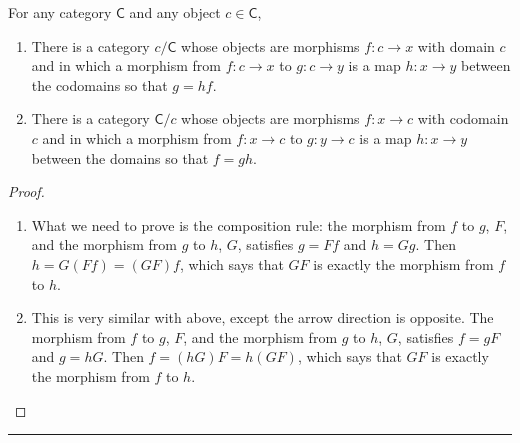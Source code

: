 \begin{prop} For any category $\mathsf{C}$ and any object $c\in \mathsf{C}$,
\begin{enumerate}
\item There is a category $c/\mathsf{C}$ whose objects are morphisms $f:c\rightarrow x$ with domain $c$ and in which a morphism from $f:c\rightarrow x$ to $g:c\rightarrow y$ is a map $h:x\rightarrow y$ between the codomains so that $g=hf$.
\item There is a category $\mathsf{C}/c$ whose objects are morphisms $f:x\rightarrow c$ with codomain $c$ and in which a morphism from $f:x\rightarrow c$ to $g:y\rightarrow c$ is a map $h:x\rightarrow y$ between the domains so that $f=gh$.
\end{enumerate}
\end{prop}
\begin{proof}
~\begin{enumerate}
\item What we need to prove is the composition rule: the morphism from $f$ to $g$, $F$, and the morphism from $g$ to $h$, $G$, satisfies $g=Ff$ and $h=Gg$. Then $h=G(Ff)=(GF)f$, which says that $GF$ is exactly the morphism from $f$ to $h$.
\item This is very similar with above, except the arrow direction is opposite. The morphism from $f$ to $g$, $F$, and the morphism from $g$ to $h$, $G$, satisfies $f=gF$ and $g=hG$. Then $f=(hG)F=h(GF)$, which says that $GF$ is exactly the morphism from $f$ to $h$.
\end{enumerate}
\end{proof}

\noindent\rule{\textwidth}{1pt}
\newline